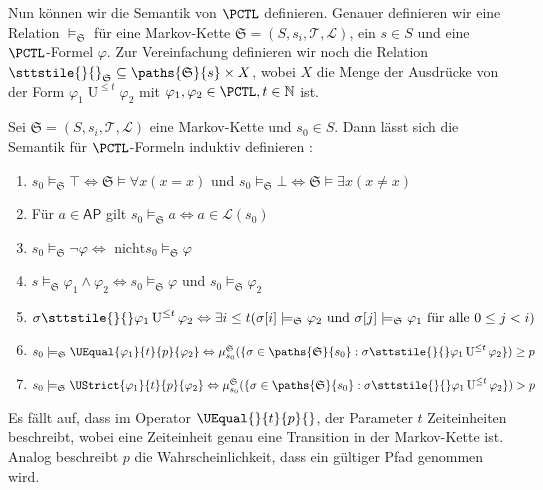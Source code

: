Nun können wir die Semantik von $\PCTL$ definieren. Genauer definieren wir eine Relation $\models_\mathfrak{S}$ für eine Markov-Kette $\mathfrak{S}=(S,s_i,\mathcal{T},\mathcal{L})$, ein $s\in S$ und eine $\PCTL$-Formel $\varphi$. Zur Vereinfachung definieren wir noch die Relation $\sttstile{}{}_\mathfrak{S} \subseteq \paths{\mathfrak{S}}{s} \times X$, wobei $X$ die Menge der Ausdrücke von der Form $\varphi_1 \operatorname{U}^{\leq t}\varphi_2$ mit $\varphi_1,\varphi_2 \in \PCTL, t\in \mathbb{N}$ ist.  

\begin{definition}
	Sei $\mathfrak{S}=(S,s_i,\mathcal{T},\mathcal{L})$ eine Markov-Kette und $s_0\in S$. Dann lässt sich die Semantik für $\PCTL$-Formeln induktiv definieren \cite{hansson1994logic}:
	\begin{enumerate}
		\item $s_0 \models_\mathfrak{S} \top \Leftrightarrow \mathfrak{S}\models \forall x(x=x)$ und $s_0\models_\mathfrak{S} \bot \Leftrightarrow \mathfrak{S}\models \exists x(x\neq x)$
		\item Für $a\in \mathsf{AP}$ gilt $s_0\models_\mathfrak{S} a \Leftrightarrow a\in \mathcal{L}(s_0)$
		\item $s_0 \models_\mathfrak{S}\neg \varphi \Leftrightarrow \text{ nicht} s_0\models_\mathfrak{S} \varphi$
		\item $s\models_\mathfrak{S} \varphi_1\land\varphi_2 \Leftrightarrow s_0\models_\mathfrak{S} \varphi \text{ und } s_0\models_\mathfrak{S} \varphi_2$
		\item $\sigma \sttstile{}{} \varphi_1\operatorname{U}^{\leq t}\varphi_2 \Leftrightarrow \exists i\leq t(\sigma[i]\models_\mathfrak{S} \varphi_2 \text{ und } \sigma[j]\models_\mathfrak{S} \varphi_1 \text{ für alle } 0 \leq j<i)$
		\item $s_0\models_\mathfrak{S} \UEqual{\varphi_1}{t}{p}{\varphi_2} \Leftrightarrow \mu^\mathfrak{S}_{s_0}(\{\sigma \in \paths{\mathfrak{S}}{s_0} : \sigma \sttstile{}{}\varphi_1\operatorname{U}^{\leq t}\varphi_2\})\geq p$
		\item $s_0\models_\mathfrak{S} \UStrict{\varphi_1}{t}{p}{\varphi_2} \Leftrightarrow \mu^\mathfrak{S}_{s_0}(\{\sigma \in \paths{\mathfrak{S}}{s_0} : \sigma \sttstile{}{}\varphi_1\operatorname{U}^{\leq t}\varphi_2\}) > p$
	\end{enumerate}
\end{definition}

Es fällt auf, dass im Operator $\UEqual{}{t}{p}{}$, der Parameter $t$  Zeiteinheiten beschreibt, wobei eine Zeiteinheit genau eine Transition in der Markov-Kette ist. Analog beschreibt $p$ die Wahrscheinlichkeit, dass ein gültiger Pfad \glqq genommen\grqq{} wird.

